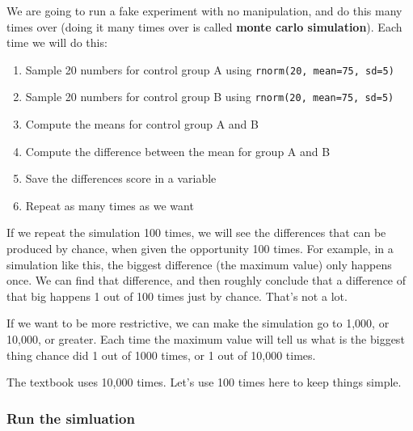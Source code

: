 \documentclass[
]{book}
\providecommand{\tightlist}{%
  \setlength{\itemsep}{0pt}\setlength{\parskip}{0pt}}
\begin{document}
We are going to run a fake experiment with no manipulation, and do this many times over (doing it many times over is called \textbf{monte carlo simulation}). Each time we will do this:

\begin{enumerate}
\def\labelenumi{\arabic{enumi}.}
\tightlist
\item
  Sample 20 numbers for control group A using \texttt{rnorm(20,\ mean=75,\ sd=5)}
\item
  Sample 20 numbers for control group B using \texttt{rnorm(20,\ mean=75,\ sd=5)}
\item
  Compute the means for control group A and B
\item
  Compute the difference between the mean for group A and B
\item
  Save the differences score in a variable
\item
  Repeat as many times as we want
\end{enumerate}

If we repeat the simulation 100 times, we will see the differences that can be produced by chance, when given the opportunity 100 times. For example, in a simulation like this, the biggest difference (the maximum value) only happens once. We can find that difference, and then roughly conclude that a difference of that big happens 1 out of 100 times just by chance. That's not a lot.

If we want to be more restrictive, we can make the simulation go to 1,000, or 10,000, or greater. Each time the maximum value will tell us what is the biggest thing chance did 1 out of 1000 times, or 1 out of 10,000 times.

The textbook uses 10,000 times. Let's use 100 times here to keep things simple.

\hypertarget{run-the-simluation}{%
\subsubsection{Run the simluation}\label{run-the-simluation}}
\end{document}
